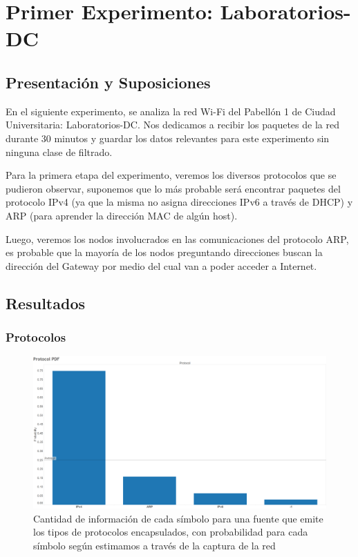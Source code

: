 \documentclass{article}
\theoremstyle{definition}
\theoremstyle{remark}
\begin{document}
\newpage
\section{Primer Experimento: Laboratorios-DC}

\subsection{Presentación y Suposiciones}

En el siguiente experimento, se analiza la red Wi-Fi del Pabellón 1 de Ciudad Universitaria: Laboratorios-DC. Nos dedicamos a recibir los paquetes de la red durante 30 minutos y guardar los datos relevantes para este experimento sin ninguna clase de filtrado.

Para la primera etapa del experimento, veremos los diversos protocolos que se pudieron observar, suponemos que lo más probable será encontrar paquetes del protocolo IPv4 (ya que la misma no asigna direcciones IPv6 a través de DHCP) y ARP (para aprender la dirección MAC de algún host).

Luego, veremos los nodos involucrados en las comunicaciones del protocolo ARP, es probable que la mayoría de los nodos preguntando direcciones buscan la dirección del Gateway por medio del cual van a poder acceder a Internet.

\subsection{Resultados}

\subsubsection{Protocolos}

\begin{figure}[H]
\centering
\includegraphics[width=450pt]{captures/LabosDC/Protocol PDF Dashboard Probabilitidad.png}
\caption{Cantidad de información de cada símbolo para una fuente que emite los tipos de protocolos encapsulados, con probabilidad para cada símbolo según estimamos a través de la captura de la red}
\end{figure}
\end{document}
